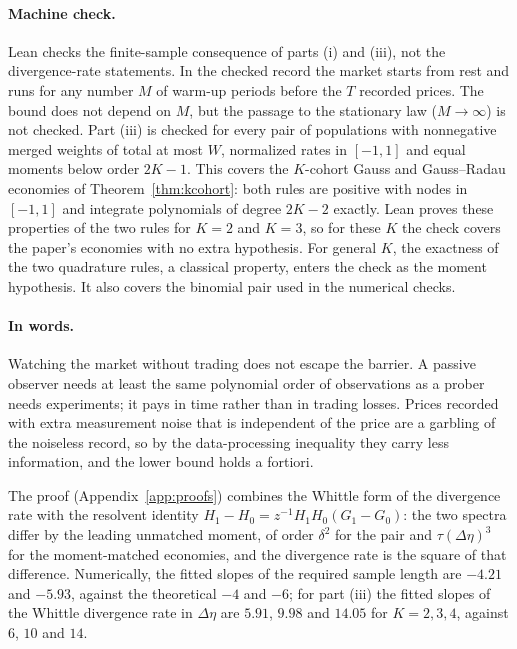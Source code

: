 \documentclass[12pt]{article}
\theoremstyle{definition}
\theoremstyle{remark}
\begin{document}
\paragraph{Machine check.} Lean checks the finite-sample consequence of parts (i) and (iii), not the divergence-rate statements. In the checked record the market starts from rest and runs for any number $M$ of warm-up periods before the $T$ recorded prices. The bound does not depend on $M$, but the passage to the stationary law ($M\to\infty$) is not checked. Part (iii) is checked for every pair of populations with nonnegative merged weights of total at most $W$, normalized rates in $[-1,1]$ and equal moments below order $2K-1$. This covers the $K$-cohort Gauss and Gauss--Radau economies of Theorem~\ref{thm:kcohort}: both rules are positive with nodes in $[-1,1]$ and integrate polynomials of degree $2K-2$ exactly. Lean proves these properties of the two rules for $K=2$ and $K=3$, so for these $K$ the check covers the paper's economies with no extra hypothesis. For general $K$, the exactness of the two quadrature rules, a classical property, enters the check as the moment hypothesis. It also covers the binomial pair used in the numerical checks.

\paragraph{In words.} Watching the market without trading does not escape the barrier. A passive observer needs at least the same polynomial order of observations as a prober needs experiments; it pays in time rather than in trading losses. Prices recorded with extra measurement noise that is independent of the price are a garbling of the noiseless record, so by the data-processing inequality they carry less information, and the lower bound holds a fortiori.


The proof (Appendix~\ref{app:proofs}) combines the Whittle form of the divergence rate with the resolvent identity $H_1-H_0=z^{-1}H_1H_0(G_1-G_0)$: the two spectra differ by the leading unmatched moment, of order $\delta^2$ for the pair and $\tau(\Delta\eta)^3$ for the moment-matched economies, and the divergence rate is the square of that difference. Numerically, the fitted slopes of the required sample length are $-4.21$ and $-5.93$, against the theoretical $-4$ and $-6$; for part (iii) the fitted slopes of the Whittle divergence rate in $\Delta\eta$ are $5.91$, $9.98$ and $14.05$ for $K=2,3,4$, against $6$, $10$ and $14$.
\end{document}
